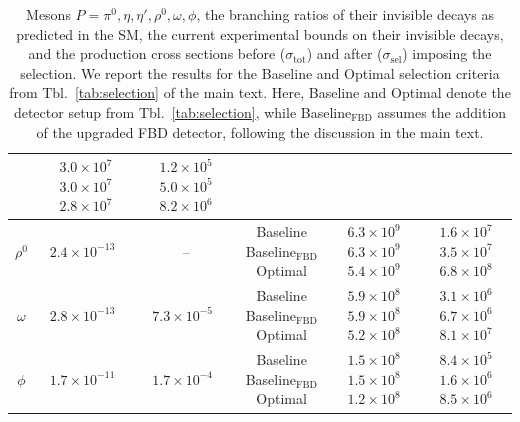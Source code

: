 \documentclass[aps,prd,preprintnumbers,superscriptaddress,nofootinbib,floatfix,twocolumn,notitlepage,reprint]{revtex4-2}
\begin{document}
\begin{table}
\begin{tabular}{|c|c|c|c|c|c|}
& \makecell{$3.0\times10^{7}$ \\ $3.0\times10^{7}$ \\ $2.8\times10^{7}$}
& \makecell{$1.2\times10^{5}$ \\ $5.0\times10^{5}$ \\ $8.2\times10^{6}$}
\\
\hline
$\rho^{0}$
& $2.4\times10^{-13}$~\cite{Schuster:2021mlr}
& --
& \makecell{Baseline \\ Baseline$_{\text{FBD}}$ \\ Optimal}
& \makecell{$6.3\times10^{9}$ \\ $6.3\times10^{9}$ \\ $5.4\times10^{9}$}
& \makecell{$1.6\times10^{7}$ \\ $3.5\times10^{7}$ \\ $6.8\times10^{8}$}
\\
\hline
$\omega$
& $2.8\times10^{-13}$~\cite{Schuster:2021mlr}
& $7.3\times10^{-5}$~\cite{ParticleDataGroup:2024cfk}
& \makecell{Baseline \\ Baseline$_{\text{FBD}}$ \\ Optimal}
& \makecell{$5.9\times10^{8}$ \\ $5.9\times10^{8}$ \\ $5.2\times10^{8}$}
& \makecell{$3.1\times10^{6}$ \\ $6.7\times10^{6}$ \\ $8.1\times10^{7}$}
\\
\hline
$\phi$
& $1.7\times10^{-11}$~\cite{Schuster:2021mlr}
& $1.7\times10^{-4}$~\cite{ParticleDataGroup:2024cfk}
& \makecell{Baseline \\ Baseline$_{\text{FBD}}$ \\ Optimal}
& \makecell{$1.5\times10^{8}$ \\ $1.5\times10^{8}$ \\ $1.2\times10^{8}$}
& \makecell{$8.4\times10^{5}$ \\ $1.6\times10^{6}$ \\ $8.5\times10^{6}$}
\\
\hline
\end{tabular}
\caption{Mesons $P=\pi^0,\eta,\eta',\rho^{0},\omega,\phi$, the branching ratios of their invisible decays as predicted in the SM, the current experimental bounds on their invisible decays, and the production cross sections before ($\sigma_{\text{tot}}$) and after ($\sigma_{\text{sel}}$) imposing the selection. We report the results for the Baseline and Optimal selection criteria from Tbl.~\ref{tab:selection} of the main text. Here, Baseline and Optimal denote the detector setup from Tbl.~\ref{tab:selection}, while Baseline$_{\text{FBD}}$ assumes the addition of the upgraded FBD detector, following the discussion in the main text.}
\label{tab:mesons_detailed}
\end{table}
\end{document}
